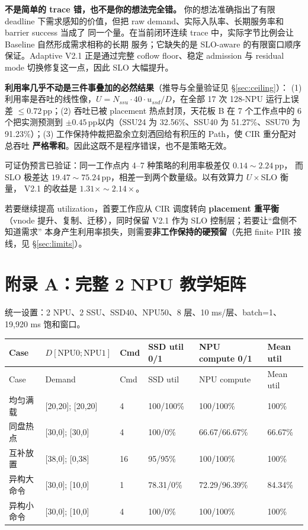 \documentclass[UTF8,fontset=none,10pt,a4paper]{ctexart}
\newcommand{\pp}{\,pp}
\begin{document}
\begin{verdictbox}[title={最终答案}]
\textbf{不是简单的 trace 错，也不是你的想法完全错。} 你的想法准确指出了有限 deadline
下需求感知的价值，但把 raw demand、实际入队率、长期服务率和 barrier success 当成了
同一个量。在当前闭环连续 trace 中，实际字节比例会让 Baseline 自然形成需求相称的长期
服务；它缺失的是 SLO-aware 的有限窗口顺序保证。Adaptive V2.1 正是通过完整 coflow
floor、稳定 admission 与 residual mode 切换修复这一点，因此 SLO 大幅提升。\par
\textbf{利用率几乎不动是三件事叠加的必然结果}（推导与全量验证见 \S\ref{sec:ceiling}）：
(1) 利用率是吞吐的线性像，$U=N_{ssu}\cdot 40\cdot u_{ssd}/D$，在全部 17 次 128-NPU
运行上误差 $\le 0.72$\pp；(2) 吞吐已被 placement 热点封顶，天花板 B 在 7 个工作点中的
6 个把实测预测到 $\pm0.45$\pp 以内（SSU24 为 32.56\%、SSU40 为 51.27\%、SSU70 为
91.23\%）；(3) 工作保持仲裁把盈余立刻洒回给有积压的 Path，使 CIR 重分配对总吞吐
\textbf{严格零和}。因此这既不是程序错误，也不是策略无效。\par\smallskip
可证伪预言已验证：同一工作点内 4--7 种策略的利用率极差仅 $0.14\sim2.24$\pp，
而 SLO 极差达 $19.47\sim75.24$\pp，相差一到两个数量级。以有效算力 $U\times$SLO 衡量，
V2.1 的收益是 $1.31\times\sim2.14\times$。\par\smallskip
若要继续提高 utilization，首要工作应从 CIR 调度转向 \textbf{placement 重平衡}
（vnode 提升、复制、迁移），同时保留 V2.1 作为 SLO 控制层；若要让“盘侧不知道需求”
本身产生利用率损失，则需要\textbf{非工作保持的硬预留}（先把 finite PIR 接线，见
\S\ref{sec:limits}）。
\end{verdictbox}

\appendix
\section{附录 A：完整 2 NPU 教学矩阵}

统一设置：2 NPU、2 SSU、SSD40、NPU50、8 层、10 ms/层、batch=1、19,920 ms 饱和窗口。

\begin{longtable}{p{27mm}p{30mm}p{15mm}p{28mm}p{30mm}p{20mm}}
\toprule
Case & $D[\mathrm{NPU0};\mathrm{NPU1}]$ & Cmd & SSD util 0/1 & NPU compute 0/1 & Mean util\\
\midrule
\endfirsthead
\toprule
Case & Demand & Cmd & SSD util & NPU compute & Mean util\\
\midrule
\endhead
均匀满载 & [20,20]; [20,20] & 4 & 100/100\% & 100/100\% & 100\%\\
同盘热点 & [30,0]; [30,0] & 4 & 100/0\% & 66.67/66.67\% & 66.67\%\\
互补放置 & [38,0]; [0,38] & 16 & 95/95\% & 100/100\% & 100\%\\
异构大命令 & [30,0]; [10,0] & 1 & 78.31/0\% & 72.29/96.39\% & 84.34\%\\
异构小命令 & [30,0]; [10,0] & 4 & 100/0\% & 100/100\% & 100\%\\
\bottomrule
\end{longtable}
\end{document}
